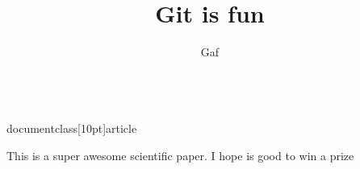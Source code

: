 \\documentclass[10pt]{article}
\author{Gaf}
\title{Git is fun}
\begin{document}
  \makefile

   This is a super awesome scientific paper.
I hope is good to win a prize
\end{document}
